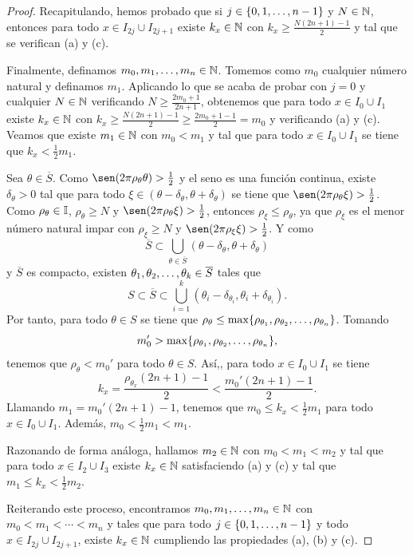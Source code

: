 \documentclass[a4paper, 12pt, oneside]{book}
\begin{document}
\begin{proof}
    Recapitulando, hemos probado que si $j \in \{0,1,\mathellipsis,n-1\}$ y $N \in \mathbb N$, entonces para todo $x \in I_{2j}\cup I_{2j+1}$ existe $k_x \in \mathbb N$ con $k_x \geq \frac{N(2n+1)-1}{2}$ y tal que se verifican (a) y (c).
    
    Finalmente, definamos $m_0,m_1,\mathellipsis,m_n\in \mathbb N$. Tomemos como $m_0$ cualquier número natural y definamos $m_1$. Aplicando lo que se acaba de probar con $j = 0$ y cualquier $N \in \mathbb N$ verificando $N \geq \frac{2m_0+1}{2n+1}$, obtenemos que para todo $x \in I_0 \cup I_1$ existe $k_x \in \mathbb N$ con $k_x \geq \frac{N(2n+1)-1}{2} \geq \frac{2m_0+1-1}{2}= m_0$ y verificando (a) y (c). Veamos que existe $m_1 \in \mathbb N$ con $m_0 < m_1$ y tal que para todo $x \in I_0\cup I_1$ se tiene que $k_x < \frac{1}{2} m_1$.

    Sea $\theta \in \overline{S}$. Como $\sen(2\pi\rho_\theta\theta) > \frac{1}{2}$ y el seno es una función continua, existe $\delta_\theta > 0$ tal que para todo ${\xi} \in (\theta-\delta_\theta,\theta+\delta_\theta)$ se tiene que $\sen(2\pi\rho_{\theta}{\xi}) > \frac{1}{2}$. Como $\rho_\theta \in \mathbb I$, $\rho_\theta \geq N$ y $\sen(2\pi\rho_\theta\xi)> \frac{1}{2}$, entonces $\rho_\xi \leq \rho_\theta$, ya que $\rho_\xi$ es el menor número natural impar con $\rho_\xi \geq N$ y $\sen(2\pi \rho_\xi\xi) > \frac{1}{2}$. Y como
    \[\overline{S} \subset \bigcup_{\theta \in \overline{S}}(\theta - \delta_\theta, \theta + \delta_\theta)\]
    y $\overline{S}$ es compacto, existen $\theta_1,\theta_2,\mathellipsis,\theta_k \in \overline{S}$ tales que
    \[S \subset \overline{S} \subset \bigcup_{i=1}^k (\theta_i-\delta_{\theta_i},\theta_i+\delta_{\theta_i}).\]
    Por tanto, para todo $\theta \in S$ se tiene que $\rho_\theta \leq \max\{\rho_{\theta_1},\rho_{\theta_2},\mathellipsis,\rho_{\theta_n}\}$. Tomando
    \[m_0' > \max \{\rho_{\theta_1},\rho_{\theta_2},\mathellipsis,\rho_{\theta_n}\},\]
    tenemos que $\rho_\theta < m_0'$ para todo $\theta \in S$. Así,, para todo $x \in I_0 \cup I_1$ se tiene
    \[k_x = \frac{\rho_{\theta_x}(2n+1)-1}{2} < \frac{m_0'(2n+1)-1}{2}.\]
    Llamando $m_1 = m_0'(2n+1)-1$, tenemos que $m_0 \leq k_x < \frac{1}{2}m_1$ para todo $x \in I_0 \cup I_1$. Además, $m_0 < \frac{1}{2}m_1 < m_1$.

    Razonando de forma análoga, hallamos $m_2 \in \mathbb N$ con $m_0 < m_1 < m_2$ y tal que para todo $x \in I_{2} \cup I_3$ existe $k_x \in \mathbb N$ satisfaciendo (a) y (c) y tal que $m_1 \leq k_x < \frac{1}{2}m_2$. 
    
    Reiterando este proceso, encontramos $m_0,m_1,\mathellipsis,m_n\in\mathbb N$ con $m_0 < m_1 < \cdots < m_n$ y tales que para todo $j \in \{0,1,\mathellipsis,n-1\}$ y todo $x \in I_{2j}\cup I_{2j+1}$, existe $k_x \in \mathbb N$ cumpliendo las propiedades (a), (b) y (c).
\end{proof}
\end{document}
